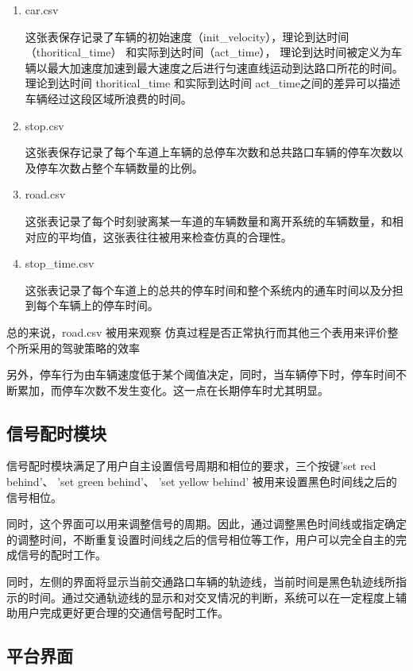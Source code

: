 \documentclass[a4paper,UTF8]{paper}
\begin{document}
\begin{enumerate}
\item car.csv

这张表保存记录了车辆的初始速度（init\_velocity），理论到达时间（thoritical\_time） 和实际到达时间（act\_time）， 理论到达时间被定义为车辆以最大加速度加速到最大速度之后进行匀速直线运动到达路口所花的时间。 理论到达时间 thoritical\_time 和实际到达时间 act\_time之间的差异可以描述车辆经过这段区域所浪费的时间。

\item stop.csv

这张表保存记录了每个车道上车辆的总停车次数和总共路口车辆的停车次数以及停车次数占整个车辆数量的比例。

\item road.csv

这张表记录了每个时刻驶离某一车道的车辆数量和离开系统的车辆数量，和相对应的平均值，这张表往往被用来检查仿真的合理性。

\item stop\_time.csv

这张表记录了每个车道上的总共的停车时间和整个系统内的通车时间以及分担到每个车辆上的停车时间。
\end{enumerate}

总的来说，road.csv 被用来观察 仿真过程是否正常执行而其他三个表用来评价整个所采用的驾驶策略的效率

另外，停车行为由车辆速度低于某个阈值决定，同时，当车辆停下时，停车时间不断累加，而停车次数不发生变化。这一点在长期停车时尤其明显。

\subsection{信号配时模块}

信号配时模块满足了用户自主设置信号周期和相位的要求，三个按键'set red behind'、 'set green behind'、 'set yellow behind' 被用来设置黑色时间线之后的信号相位。

同时，这个界面可以用来调整信号的周期。因此，通过调整黑色时间线或指定确定的调整时间，不断重复设置时间线之后的信号相位等工作，用户可以完全自主的完成信号的配时工作。

同时，左侧的界面将显示当前交通路口车辆的轨迹线，当前时间是黑色轨迹线所指示的时间。通过交通轨迹线的显示和对交叉情况的判断，系统可以在一定程度上辅助用户完成更好更合理的交通信号配时工作。
\subsection{平台界面}
\end{document}

